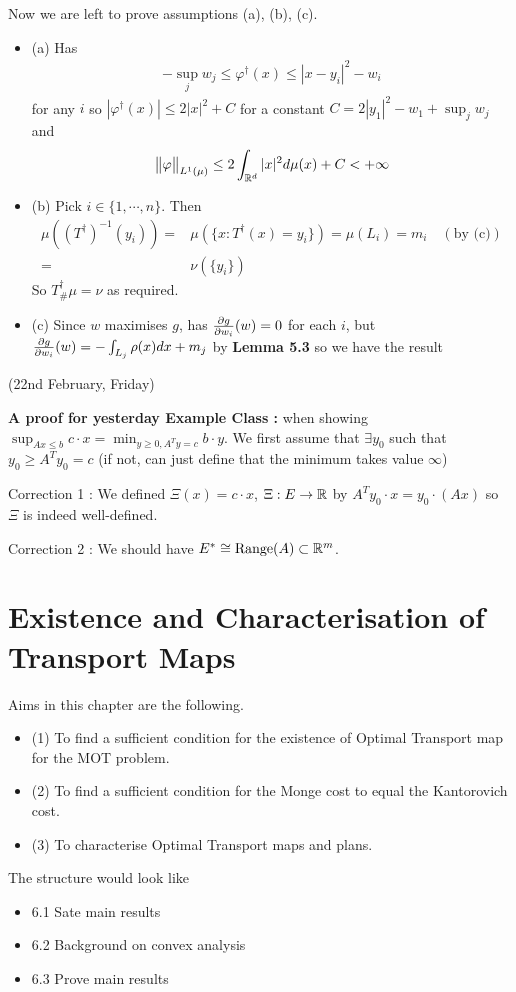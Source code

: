 \documentclass[12pt,a4paper]{article}
\newenvironment{proof}
{\begin{changemargin}{1cm}{0.5cm} 
	}%
	{\end{changemargin}
}
\renewenvironment{i}
{\begin{itemize} 
	}%
	{\end{itemize}
}
\newenvironment{p}
{\begin{proof} 
	}%
	{\end{proof}
}
\begin{document}
\begin{p}
Now we are left to prove assumptions (a), (b), (c).
\begin{i}
\item[(a)] Has
\begin{align*}
-\sup_{j} w_j \leq \varphi^{\dagger}(x) \leq |x- y_i|^2 - w_i
\end{align*}
for any $i$ so $|\varphi^{\dagger}(x)| \leq 2|x|^2 + C$ for a constant $C= 2|y_1|^2 - w_1 + \sup_j w_j$ and
\begin{align*}
\bigl\lVert\varphi\bigr\rVert_{L^1(\mu)} \leq 2\int_{\mathbb{R}^d} |x|^2 d\mu(x) + C < + \infty
\end{align*}
\item[(b)] Pick $i\in \{1, \cdots, n\}$. Then
\begin{align*}
\mu((T^{\dagger})^{-1} (y_i)) =& \mu(\{x: T^{\dagger}(x) = y_i \}) = \mu(L_i) = m_i \quad (\text{by (c)}) \\
=& \nu(\{y_i\})
\end{align*}
So $T^{\dagger}_{\#} \mu = \nu$ as required.
\item[(c)] Since $w$ maximises $g$, has $\frac{\partial g}{\partial w_i}(w) =0$ for each $i$, but $\frac{\partial g}{\partial w_i}(w) = - \int_{L_j} \rho(x) dx + m_j$ by \textbf{Lemma 5.3} so we have the result
\end{i} 
\eop
\end{p}
\s

\newday

(22nd February, Friday)
\s

\textbf{A proof for yesterday Example Class :} when showing $\sup_{Ax\leq b} c\cdot x = \min_{y\geq 0, A^T y =c} b\cdot y$. We first assume that $\exists y_0$ such that $y_0 \geq A^T y_0 =c$ (if not, can just define that the minimum takes value $\infty$)
\s

Correction 1 : We defined $\Xi(x) = c\cdot x$, $\Xi : E\rightarrow \mathbb{R}$ by $A^T y_0 \cdot x = y_0 \cdot (Ax)$ so $\Xi$ is indeed well-defined.

Correction 2 : We should have $E^* \cong \text{Range}(A) \subset \mathbb{R}^m$.
\s

\section{Existence and Characterisation of Transport Maps}

Aims in this chapter are the following.
\begin{i}
\item[(1)] To find a sufficient condition for the existence of Optimal Transport map for the MOT problem.
\item[(2)] To find a sufficient condition for the Monge cost to equal the Kantorovich cost.
\item[(3)] To characterise Optimal Transport maps and plans.
\end{i}
The structure would look like
\begin{i}
\item[6.1] Sate main results
\item[6.2] Background on convex analysis
\item[6.3] Prove main results
\end{i}
\end{document}

